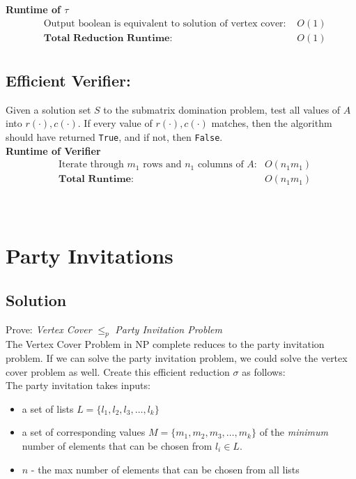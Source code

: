 \documentclass[11pt]{article}
\begin{document}
\textbf{Runtime of $\tau$ }
\begin{align*}
&\text{Output boolean is equivalent to solution of vertex cover: } &O(1)\\ 
&\textbf{Total Reduction Runtime: } &O(1)\\
\end{align*}


\subsection{Efficient Verifier:}
Given a solution set $S$ to the submatrix domination problem, test all values of $A$ into $r(\cdot),c(\cdot)$. If every value of $r(\cdot),c(\cdot)$ matches, then the algorithm should have returned \texttt{True}, and if not, then \texttt{False}. \\

\textbf{Runtime of Verifier }
\begin{align*}
&\text{Iterate through $m_1$ rows and $n_1$ columns of $A$:} &O(n_1m_1)\\
&\textbf{Total Runtime: } &O(n_1m_1)\\
\end{align*}

\begin{center}
\quad{}\quad{}\\
\end{center}

\section{Party Invitations}

\subsection{Solution}

Prove: \textit{Vertex Cover} $\leq_p$ \textit{Party Invitation Problem}\\

The Vertex Cover Problem in NP complete reduces to the party invitation problem. If we can solve the party invitation problem, we could solve the vertex cover problem as well. Create this efficient reduction $\sigma$ as follows:  \\

The party invitation takes inputs:
\begin{itemize}
\item a set of lists $L = \{l_1,l_2,l_3, \ldots, l_{k}\}$
\item a set of corresponding values $M = \{m_1, m_2, m_3, \ldots, m_k\}$ of the \textit{minimum} number of elements that can be chosen from $l_i \in L$.
\item $n$ - the max number of elements that can be chosen from all lists
\end{itemize}
\end{document}
